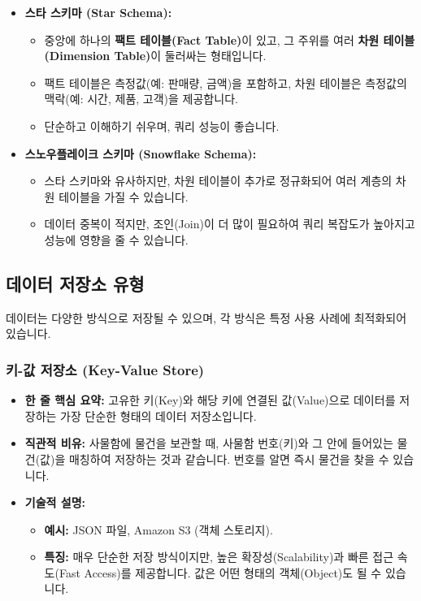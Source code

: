 \documentclass[11pt,a4paper]{article}
\theoremstyle{definition}
\begin{document}
\begin{itemize}
    \item \textbf{스타 스키마 (Star Schema):}
    \begin{itemize}
        \item 중앙에 하나의 \textbf{팩트 테이블(Fact Table)}이 있고, 그 주위를 여러 \textbf{차원 테이블(Dimension Table)}이 둘러싸는 형태입니다.
        \item 팩트 테이블은 측정값(예: 판매량, 금액)을 포함하고, 차원 테이블은 측정값의 맥락(예: 시간, 제품, 고객)을 제공합니다.
        \item 단순하고 이해하기 쉬우며, 쿼리 성능이 좋습니다.
    \end{itemize}
    \item \textbf{스노우플레이크 스키마 (Snowflake Schema):}
    \begin{itemize}
        \item 스타 스키마와 유사하지만, 차원 테이블이 추가로 정규화되어 여러 계층의 차원 테이블을 가질 수 있습니다.
        \item 데이터 중복이 적지만, 조인(Join)이 더 많이 필요하여 쿼리 복잡도가 높아지고 성능에 영향을 줄 수 있습니다.
    \end{itemize}
\end{itemize}

\subsection{데이터 저장소 유형}

데이터는 다양한 방식으로 저장될 수 있으며, 각 방식은 특정 사용 사례에 최적화되어 있습니다.

\subsubsection{키-값 저장소 (Key-Value Store)}
\begin{itemize}
    \item \textbf{한 줄 핵심 요약:} 고유한 키(Key)와 해당 키에 연결된 값(Value)으로 데이터를 저장하는 가장 단순한 형태의 데이터 저장소입니다.
    \item \textbf{직관적 비유:} 사물함에 물건을 보관할 때, 사물함 번호(키)와 그 안에 들어있는 물건(값)을 매칭하여 저장하는 것과 같습니다. 번호를 알면 즉시 물건을 찾을 수 있습니다.
    \item \textbf{기술적 설명:}
    \begin{itemize}
        \item \textbf{예시:} JSON 파일, Amazon S3 (객체 스토리지).
        \item \textbf{특징:} 매우 단순한 저장 방식이지만, 높은 확장성(Scalability)과 빠른 접근 속도(Fast Access)를 제공합니다. 값은 어떤 형태의 객체(Object)도 될 수 있습니다.
    \end{itemize}
\end{itemize}
\end{document}
